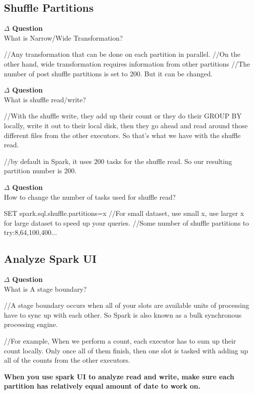 \documentclass[12pt]{article}
\newenvironment{que}
    { \begin{mdframed}[backgroundcolor=green!20] \textbf{$\Delta$ Question} \\}
    {  \end{mdframed}}
\begin{document}
\subsection{Shuffle Partitions}
\begin{que}
What is Narrow/Wide Transformation?
\end{que}
\begin{code}
//Any transformation that can be done on each partition in parallel.
//On the other hand, wide transformation requires information from other partitions
//The number of post shuffle partitions is set to 200. But it can be changed.
\end{code}
\begin{que}
What is shuffle read/write?
\end{que}
\begin{code}
//With the shuffle write, they add up their count or they do their GROUP BY locally, write it out to their local disk, then they go ahead and read around those different files from the other executors. So that's what we have with the shuffle read.

//by default in Spark, it uses 200 tasks for the shuffle read. So our resulting partition number is 200.
\end{code}

\begin{que}
How to change the number of tasks used for shuffle read?
\end{que}
\begin{code}
SET spark.sql.shuffle.partitions=x
//For small dataset, use small x, use larger x for large dataset to speed up your queries.
//Some number of shuffle partitions to try:8,64,100,400...
\end{code}
\subsection{Analyze Spark UI}
\begin{que}
What is A stage boundary?
\end{que}
\begin{code}
//A stage boundary occurs when all of your slots are available units of processing have to sync up with each other. So Spark is also known as a bulk synchronous processing engine. 

//For example, When we perform a count, each executor has to sum up their count locally. Only once all of them finish, then one slot is tasked with adding up all of the counts from the other executors. 
\end{code}
\textbf{When you use spark UI to analyze read and write, make sure each partition has relatively equal amount of date to work on.}
\end{document}
